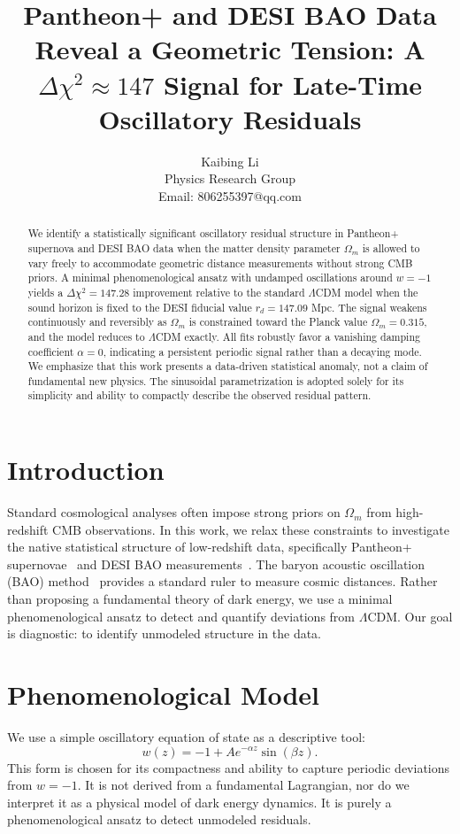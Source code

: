 \documentclass[10pt,a4paper,twocolumn]{article}
\begin{document}
\title{Pantheon+ and DESI BAO Data Reveal a Geometric Tension:
A $\Delta\chi^2\approx147$ Signal for Late-Time Oscillatory Residuals}
\author{Kaibing Li\\
Physics Research Group\\
Email: 806255397@qq.com}
\date{}
\maketitle

\begin{abstract}
We identify a statistically significant oscillatory residual structure in Pantheon+ supernova and DESI BAO data
when the matter density parameter $\Omega_m$ is allowed to vary freely to accommodate geometric distance measurements
without strong CMB priors.
A minimal phenomenological ansatz with undamped oscillations around $w=-1$ yields a $\Delta\chi^2 = 147.28$ improvement
relative to the standard $\Lambda$CDM model when the sound horizon is fixed to the DESI fiducial value $r_d=147.09$ Mpc.
The signal weakens continuously and reversibly as $\Omega_m$ is constrained toward the Planck value $\Omega_m = 0.315$,
and the model reduces to $\Lambda$CDM exactly.
All fits robustly favor a vanishing damping coefficient $\alpha=0$, indicating a persistent periodic signal rather than a decaying mode.
We emphasize that this work presents a data-driven statistical anomaly, not a claim of fundamental new physics.
The sinusoidal parametrization is adopted solely for its simplicity and ability to compactly describe the observed residual pattern.
\end{abstract}

\section{Introduction}
Standard cosmological analyses often impose strong priors on $\Omega_m$ from high-redshift CMB observations.
In this work, we relax these constraints to investigate the native statistical structure of low-redshift data,
specifically Pantheon+ supernovae~\cite{Scolnic2022} and DESI BAO measurements~\cite{DESI2024}.
The baryon acoustic oscillation (BAO) method~\cite{Eisenstein2005} provides a standard ruler to measure cosmic distances.
Rather than proposing a fundamental theory of dark energy,
we use a minimal phenomenological ansatz to detect and quantify deviations from $\Lambda$CDM.
Our goal is diagnostic: to identify unmodeled structure in the data.

\section{Phenomenological Model}
We use a simple oscillatory equation of state as a descriptive tool:
\[
w(z) = -1 + A e^{-\alpha z}\sin(\beta z).
\]
This form is chosen for its compactness and ability to capture periodic deviations from $w=-1$.
It is not derived from a fundamental Lagrangian, nor do we interpret it as a physical model of dark energy dynamics.
It is purely a phenomenological ansatz to detect unmodeled residuals.
\end{document}
